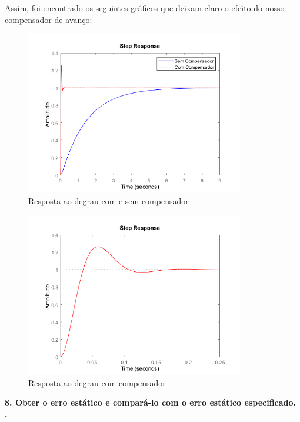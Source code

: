 Assim, foi encontrado os seguintes gráficos que deixam claro o efeito do nosso compensador de avanço:

\begin{figure}[H]
  \centering
  \includegraphics[width=0.85\textwidth]{images/fig5.png}
  \caption{Resposta ao degrau com e sem compensador}
\end{figure}

\begin{figure}[H]
  \centering
  \includegraphics[width=0.85\textwidth]{images/fig6.png}
  \caption{Resposta ao degrau com compensador}
\end{figure} \newpage


\noindent \textbf{8. Obter o erro estático e compará-lo com o erro estático especificado. .}\\

